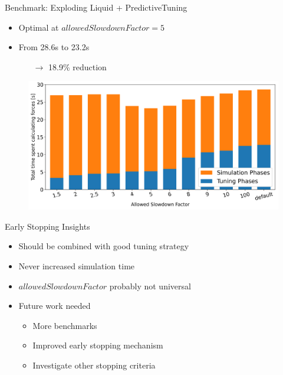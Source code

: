 \documentclass[
	10pt,
	t		%
]{beamer}
\begin{document}
\begin{frame}{Benchmark: Exploding Liquid + PredictiveTuning}

    \begin{itemize}
        \item Optimal at $allowedSlowdownFactor = 5$
        \item From 28.6s to 23.2s
              \begin{itemize}
                  \item[$\rightarrow$] 18.9\% reduction
              \end{itemize}
    \end{itemize}


    \begin{figure}[H]
        \centering

        \includegraphics[width=0.92\columnwidth]{../../data/explodingLiquid/cluster/predictiveTuning/analytics/total_time_average_full_scale.png}


    \end{figure}

\end{frame}


\begin{frame}{Early Stopping Insights}

    \begin{itemize}
        \item Should be combined with good tuning strategy
        \item Never increased simulation time
        \item $allowedSlowdownFactor$ probably not universal
        \item Future work needed
              \begin{itemize}
                  \item More benchmarks
                  \item Improved early stopping mechanism
                  \item Investigate other stopping criteria
              \end{itemize}
    \end{itemize}
\end{frame}
\end{document}

